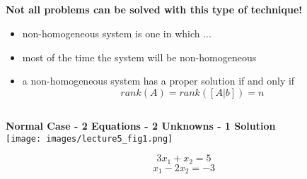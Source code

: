 \documentclass[fleqn]{beamer} %
\newcommand{\sectionIIIsubsectionItitle}{}
\newcommand{\sectionIIIsubsectionIItitle}{}
\newcommand{\sectionIIIsubsectionIIItitle}{}
\begin{document}
			\begin{frame}
				\frametitle{\sectionIIIsubsectionItitle}
				\bigskip

			  
				\btVFill
			\end{frame}

		\subsection{\sectionIIIsubsectionIItitle}\label{sectionIIIsubsectionII}	

			\begin{frame}
				\frametitle{\sectionIIIsubsectionIItitle}
				\bigskip

				\textbf{ Not all problems can be solved with this type of technique!} \vspace{3mm}\\	
				\begin{itemize}
					\item {\PR non-homogeneous} system is one in which ... \vspace{10mm}\\
					\item most of the time the system will be {\PR non-homogeneous} \vspace{10mm}\\
					\item a {\PR non-homogeneous} system has a {\BL proper solution} if and only if\vspace{2mm}\\
					\[rank(A)=rank([A | b])=n\]
				\end{itemize}
				
				\btVFill
			\end{frame}

			\begin{frame}
				\frametitle{\sectionIIIsubsectionIItitle}
				\bigskip
				

				\btVFill
			\end{frame}

		\subsection{\sectionIIIsubsectionIIItitle}\label{sectionIIIsubsectionIII}

			\begin{frame}
				\frametitle{\sectionIIIsubsectionIIItitle}
				\bigskip

				{\bf Normal Case - 2 Equations - 2 Unknowns - 1 Solution} \\ \vspace{2mm}
				\texttt{[image: images/lecture5\_fig1.png]} \\
				\begin{fleqn}
					\[3x_1+x_2=5\]
					\[x_1-2x_2=-3\]
				\end{fleqn}

				\btVFill
			\end{frame}
\end{document}
